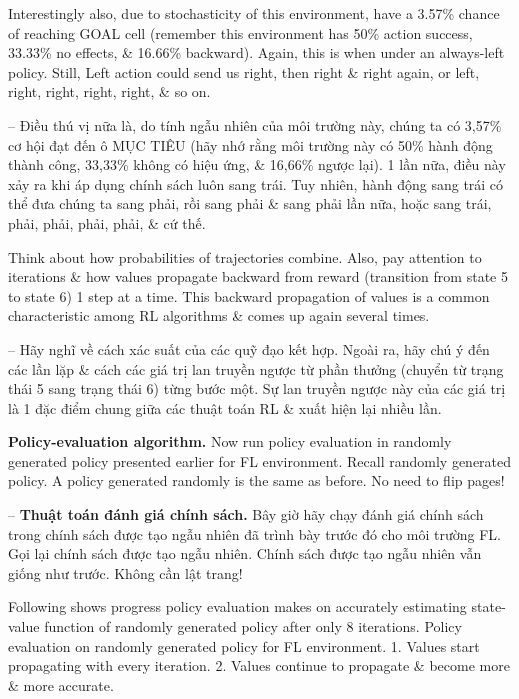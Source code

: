 \documentclass{article}
\begin{document}
\begin{itemize}
\begin{itemize}
\begin{itemize}
            Interestingly also, due to stochasticity of this environment, have a 3.57\% chance of reaching GOAL cell (remember this environment has 50\% action success, 33.33\% no effects, \& 16.66\% backward). Again, this is when under an always-left policy. Still, Left action could send us right, then right \& right again, or left, right, right, right, right, \& so on.

            -- Điều thú vị nữa là, do tính ngẫu nhiên của môi trường này, chúng ta có 3,57\% cơ hội đạt đến ô MỤC TIÊU (hãy nhớ rằng môi trường này có 50\% hành động thành công, 33,33\% không có hiệu ứng, \& 16,66\% ngược lại). 1 lần nữa, điều này xảy ra khi áp dụng chính sách luôn sang trái. Tuy nhiên, hành động sang trái có thể đưa chúng ta sang phải, rồi sang phải \& sang phải lần nữa, hoặc sang trái, phải, phải, phải, phải, \& cứ thế.

            Think about how probabilities of trajectories combine. Also, pay attention to iterations \& how values propagate backward from reward (transition from state 5 to state 6) 1 step at a time. This backward propagation of values is a common characteristic among RL algorithms \& comes up again several times.

            -- Hãy nghĩ về cách xác suất của các quỹ đạo kết hợp. Ngoài ra, hãy chú ý đến các lần lặp \& cách các giá trị lan truyền ngược từ phần thưởng (chuyển từ trạng thái 5 sang trạng thái 6) từng bước một. Sự lan truyền ngược này của các giá trị là 1 đặc điểm chung giữa các thuật toán RL \& xuất hiện lại nhiều lần.

            {\bf Policy-evaluation algorithm.} Now run policy evaluation in randomly generated policy presented earlier for FL environment. {\sf Recall randomly generated policy.} A policy generated randomly is the same as before. No need to flip pages!

            -- {\bf Thuật toán đánh giá chính sách.} Bây giờ hãy chạy đánh giá chính sách trong chính sách được tạo ngẫu nhiên đã trình bày trước đó cho môi trường FL. {\sf Gọi lại chính sách được tạo ngẫu nhiên.} Chính sách được tạo ngẫu nhiên vẫn giống như trước. Không cần lật trang!

            Following shows progress policy evaluation makes on accurately estimating state-value function of randomly generated policy after only 8 iterations. {\sf Policy evaluation on randomly generated policy for FL environment.} 1. Values start propagating with every iteration. 2. Values continue to propagate \& become more \& more accurate.


\end{itemize}
\end{itemize}
\end{itemize}
\end{document}
